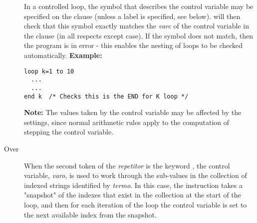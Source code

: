 \begin{description}
In a controlled loop, the symbol that describes the control variable may
be specified on the  clause (unless a label is specified,
see below).
\nr{} will then check that this symbol exactly matches the
\emph{varc} of the control variable in the  clause (in
all respects except case).
If the symbol does not match, then the program is in error - this
enables the nesting of loops to be checked automatically.
 \textbf{Example:}
\begin{lstlisting}
loop k=1 to 10
  ...
  ...
end k  /* Checks this is the END for K loop */
\end{lstlisting}
\textbf{Note: }The values taken by the control variable may be affected by the
 settings, since normal \nr{} arithmetic rules apply
to the computation of stepping the control variable.
\item[Over]\label{refloopov}

When the second token of the \emph{repetitor} is the keyword
, the control variable, \emph{varo}, is used
to work through the sub-values in the collection of indexed strings
identified by \emph{termo}.
In this case, the  instruction takes a "snapshot" of
the indexes that exist in the collection at the start of the loop, and
then for each iteration of the loop the control variable is set to the
next available index from the snapshot.
 

\end{description}
